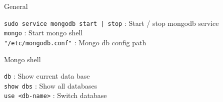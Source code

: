 \documentclass[10pt]{article}
\newcommand{\code}[1]{{\color{teal}\texttt{#1}}}
\newcommand{\cmd}[3][.3]{\code{#2} : #3 \\[#1em]}
\newcommand{\cluster}[2]{\begin{mybox}{#1}
  #2
  \vspace*{-1.3em}
\end{mybox}}
\begin{document}
\begin{multicols*}{2}

  \cluster{General}{
    \cmd{sudo service mongodb start | stop}{Start / stop mongodb service}
    \cmd{mongo}{Start mongo shell}
    \cmd{"/etc/mongodb.conf"}{Mongo db config path}
  }

  \cluster{Mongo shell}{
    \cmd{db}{Show current data base}
    \cmd{show dbs}{Show all databases}
    \cmd{use <db-name>}{Switch database}
  }

\end{multicols*}
\end{document}
